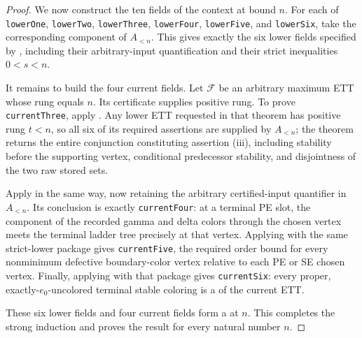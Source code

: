 \begin{proof}
We now construct the ten fields of the context at bound \(n\).  For each
of \texttt{lowerOne}, \texttt{lowerTwo}, \texttt{lowerThree},
\texttt{lowerFour}, \texttt{lowerFive}, and \texttt{lowerSix}, take the
corresponding component of \(A_{<n}\).  This gives exactly the six lower
fields specified by , including their
arbitrary-input quantification and their strict inequalities
\(0<s<n\).

It remains to build the four current fields.  Let
\(\mathcal F\) be an arbitrary maximum ETT whose rung equals \(n\).  Its
 certificate supplies positive rung.  To
prove \texttt{currentThree}, apply .  Any lower ETT
requested in that theorem has positive rung \(t<n\), so all six of its
required assertions are supplied by \(A_{<n}\); the theorem returns the
entire conjunction constituting assertion (iii), including stability before
the supporting vertex, conditional predecessor stability, and disjointness
of the two raw stored sets.

Apply  in the same way, now retaining the arbitrary
certified-input quantifier in \(A_{<n}\).  Its conclusion is exactly
\texttt{currentFour}: at a terminal PE slot, the component of the recorded
gamma and delta colors through the chosen vertex meets the terminal ladder
tree precisely at that vertex.  Applying  with the same
strict-lower package gives \texttt{currentFive}, the required order bound
for every nonminimum defective boundary-color vertex relative to each PE or
SE chosen vertex.  Finally, applying  with that package gives
\texttt{currentSix}: every proper, exactly-\(e_0\)-uncolored terminal stable
coloring is a  of the current ETT.

These six lower fields and four current fields form a
 at \(n\).  This completes the strong
induction and proves the result for every natural number \(n\).
\end{proof}
